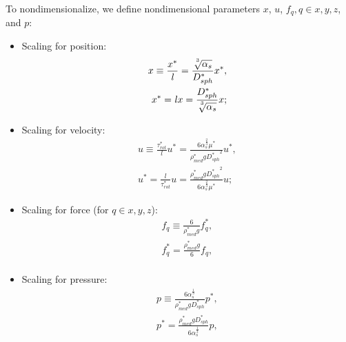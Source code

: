 \documentclass[10pt,a4paper]{article}
\begin{document}
To nondimensionalize, we define nondimensional parameters $x$, $u$, $f_q, q \in x, y, z$,  and $p$:
\begin{itemize}
	\item Scaling for position:
	\begin{eqnarray*}
		x \equiv \frac{x^*}{\mathit{l}} = \frac{\sqrt[\uproot{5}3]{\alpha_s}}{D_{sph}^*}x^*, \\
	    x^* = \mathit{l} x = \frac{D_{sph}^*}{\sqrt[\uproot{5}3]{\alpha_s}} x;
    \end{eqnarray*} 
	\item Scaling for velocity:
		\begin{eqnarray*}
			u \equiv \frac{\tau^*_{rot}}{\mathit{l}} u^* = \frac{6 \alpha_s^{\frac{2}{3}} \mu^*}{\rho_{med}^* g {D_{sph}^*}^2} u^*, \\
	      	u^* = \frac{\mathit{l}}{\tau^*_{rot}} u = \frac{\rho_{med}^* g {D_{sph}^*}^2}{6 \alpha_s^{\frac{2}{3}} \mu^*} u;
    \end{eqnarray*} 
	\item Scaling for force (for $q \in x, y, z$):
		\begin{eqnarray*}
			f_q \equiv \frac{6}{\rho_{med}^* g} f_q^*, \\
			f_q^* = \frac{\rho_{med}^* g}{6} f_q, \\
    \end{eqnarray*} 
	\item Scaling for pressure:
		\begin{eqnarray*}
			p \equiv \frac{6 \alpha_s^{\frac{1}{3}}}{\rho_{med}^* g D_{sph}^*} p^*, \\
			p^* = \frac{\rho_{med}^* g D_{sph}^*}{6 \alpha_s^{\frac{1}{3}}} p, 
    \end{eqnarray*} 
\end{itemize}
\end{document}
